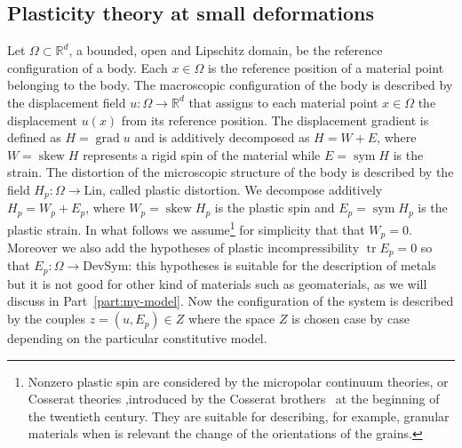 \documentclass[a4paper,10pt,twoside]{amsbook}
\numberwithin{section}{chapter}
\numberwithin{equation}{chapter}
\theoremstyle{definition}
\DeclareMathOperator{\tr}{tr}
\DeclareMathOperator{\sym}{sym}
\DeclareMathOperator{\ske}{skew}
\DeclareMathOperator{\grad}{grad}
\begin{document}
\subsection{Plasticity theory at small deformations}

Let $\Omega\subset\mathbb{R}^d$, a bounded, open and Lipschitz domain, be the reference configuration of a body. Each $x\in\Omega$ is the reference position of a material point belonging to the body. The macroscopic configuration of the body is described by the displacement field $u\colon\Omega\to\mathbb{R}^d$ that assigns to each material point $x\in\Omega$ the displacement $u(x)$ from its reference position. The displacement gradient is defined as $H=\grad u$ and is additively decomposed as $H=W+E$, where $W=\ske H$ represents a rigid spin of the material while $E=\sym H$ is the strain. The distortion of the microscopic structure of the body is described by the field $H_p\colon\Omega\to\text{Lin}$, called plastic distortion. We decompose additively $H_p=W_p+E_p$, where $W_p=\ske H_p$ is the plastic spin and $E_p=\sym H_p$ is the plastic strain. In what follows we assume\footnote{Nonzero plastic spin are considered by the micropolar continuum theories, or Cosserat theories ,introduced by the Cosserat brothers~\cite{cosserat1909} at the beginning of the twentieth century. They are suitable for describing, for example, granular materials when is relevant the change of the orientations of the grains.} for simplicity that that $W_p=0$. Moreover we also add the hypotheses of plastic incompressibility $\tr E_p=0$ so that $E_p\colon\Omega\to\text{DevSym}$: this hypotheses is suitable for the description of metals but it is not good for other kind of materials such as geomaterials, as we will discuss in Part~\ref{part:my-model}. Now the configuration of the system is described by the couples $z=(u,E_p)\in Z$ where the space $Z$ is chosen case by case depending on the particular constitutive model.
\end{document}
